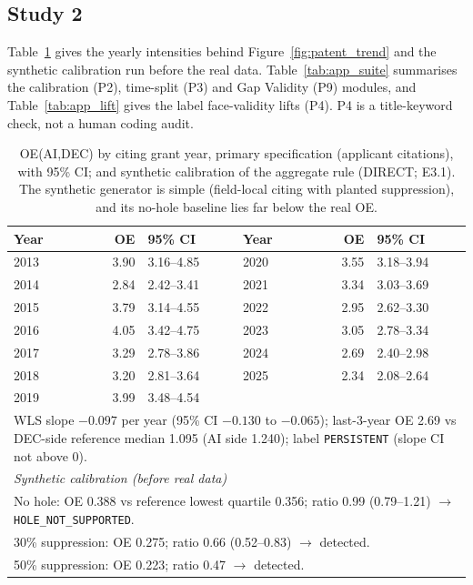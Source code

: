 \subsection{Study 2}

Table~\ref{tab:app_oeyear} gives the yearly intensities behind Figure~\ref{fig:patent_trend} and the synthetic calibration run before the real data. Table~\ref{tab:app_suite} summarises the calibration (P2), time-split (P3) and Gap Validity (P9) modules, and Table~\ref{tab:app_lift} gives the label face-validity lifts (P4). P4 is a title-keyword check, not a human coding audit.

\begin{table}[tbp]
\centering
\caption{OE(AI,DEC) by citing grant year, primary specification (applicant citations), with 95\% CI; and synthetic calibration of the aggregate rule (DIRECT; E3.1). The synthetic generator is simple (field-local citing with planted suppression), and its no-hole baseline lies far below the real OE.}
\label{tab:app_oeyear}
\footnotesize
\begin{tabular}{lrl@{\hspace{1.2cm}}lrl}
\toprule
Year & OE & 95\% CI & Year & OE & 95\% CI \\
\midrule
2013 & 3.90 & 3.16--4.85 & 2020 & 3.55 & 3.18--3.94 \\
2014 & 2.84 & 2.42--3.41 & 2021 & 3.34 & 3.03--3.69 \\
2015 & 3.79 & 3.14--4.55 & 2022 & 2.95 & 2.62--3.30 \\
2016 & 4.05 & 3.42--4.75 & 2023 & 3.05 & 2.78--3.34 \\
2017 & 3.29 & 2.78--3.86 & 2024 & 2.69 & 2.40--2.98 \\
2018 & 3.20 & 2.81--3.64 & 2025 & 2.34 & 2.08--2.64 \\
2019 & 3.99 & 3.48--4.54 & & & \\
\midrule
\multicolumn{6}{p{8.4cm}}{WLS slope $-0.097$ per year (95\% CI $-0.130$ to $-0.065$); last-3-year OE 2.69 vs DEC-side reference median 1.095 (AI side 1.240); label \texttt{PERSISTENT} (slope CI not above 0).} \\
\midrule
\multicolumn{6}{l}{\emph{Synthetic calibration (before real data)}} \\
\multicolumn{6}{p{8.4cm}}{No hole: OE 0.388 vs reference lowest quartile 0.356; ratio 0.99 (0.79--1.21) $\rightarrow$ \texttt{HOLE\_\allowbreak NOT\_\allowbreak SUPPORTED}.} \\
\multicolumn{6}{p{8.4cm}}{30\% suppression: OE 0.275; ratio 0.66 (0.52--0.83) $\rightarrow$ detected.} \\
\multicolumn{6}{p{8.4cm}}{50\% suppression: OE 0.223; ratio 0.47 $\rightarrow$ detected.} \\
\bottomrule
\end{tabular}
\end{table}

